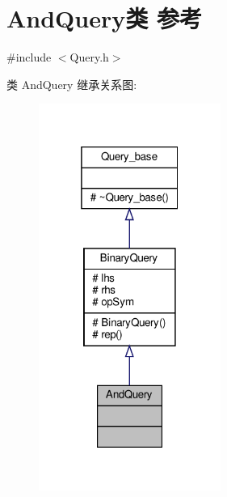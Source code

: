 \hypertarget{classAndQuery}{}\section{And\+Query类 参考}
\label{classAndQuery}


{\ttfamily \#include $<$Query.\+h$>$}



类 And\+Query 继承关系图\+:\nopagebreak
\begin{figure}[H]
\begin{center}
\leavevmode
\includegraphics[width=169pt]{classAndQuery__inherit__graph}
\end{center}
\end{figure}


